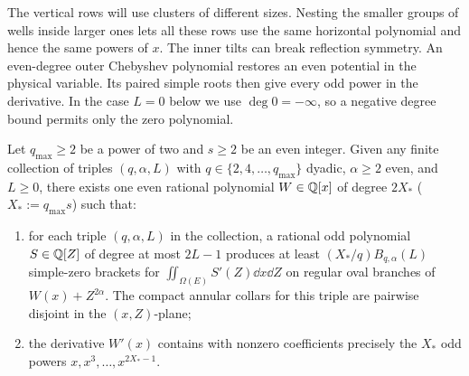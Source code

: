 The vertical rows will use clusters of different sizes. Nesting the smaller groups of wells inside larger ones lets all these rows use the same horizontal polynomial and hence the same powers of \(x\).
The inner tilts can break reflection symmetry. An even-degree outer Chebyshev polynomial restores an even potential in the physical variable. Its paired simple roots then give every odd power in the derivative. In the case \(L=0\) below we use \(\deg 0=-\infty\), so a negative degree bound permits only the zero polynomial.
\begin{lemma}\label{lem:horizontal-glue}
Let $q_{\max}\ge 2$ be a power of two and $s\ge 2$ be an even integer. Given any finite collection of triples $(q,\alpha,L)$ with $q\in\{2,4,\dots,q_{\max}\}$ dyadic, $\alpha\ge 2$ even, and $L\ge 0$, there exists one even rational polynomial $W\in\mathbb{Q}[x]$ of degree $2X_*$ ($X_*:=q_{\max} s$) such that:
\begin{enumerate}[label=(\alph*),nosep]
  \item for each triple $(q,\alpha,L)$ in the collection, a rational odd polynomial $S\in\mathbb{Q}[Z]$ of degree at most $2L-1$ produces at least $(X_*/q)B_{q,\alpha}(L)$ simple-zero brackets for $\iint_{\Omega(E)}S'(Z)\dd x\dd Z$ on regular oval branches of $W(x)+Z^{2\alpha}$. The compact annular collars for this triple are pairwise disjoint in the $(x,Z)$-plane;
  \item the derivative $W'(x)$ contains with nonzero coefficients precisely the $X_*$ odd powers $x,x^3,\dots,x^{2X_*-1}$.
\end{enumerate}
\end{lemma}

